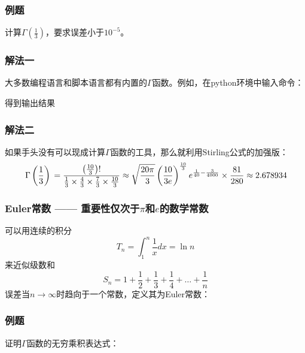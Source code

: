 \documentclass[CJK,13pt]{beamer}
\begin{document}
\begin{frame}
  \frametitle{例题}
  
  计算$\Gamma\left(\frac{1}{3}\right)$，要求误差小于$10^{-5}$。
  
\end{frame}


\begin{frame}
  \frametitle{ 解法一}
  
  大多数编程语言和脚本语言都有内置的$\Gamma$函数。例如，在python环境中输入命令：

  \skipline

  
  
  得到输出结果

  \skipline
  
  \tbox
  {
  }
  
\end{frame}


\begin{frame}
  \frametitle{ 解法二}
  
  如果手头没有可以现成计算$\Gamma$函数的工具，那么就利用Stirling公式的加强版：
    {\small
    $$
      \,\Gamma\left( \frac{1}{3} \right)\, = \frac{ \left(\frac{10}{3}\right)!}{\frac{1}{3}\times \frac{4}{3} \times \frac{7}{3}\times\frac{10}{3}}  \approx \sqrt{\frac{20\pi}{3}}\left(\frac{10}{3e}\right)^{\frac{10}{3}} e^{\frac{1}{40} - \frac{3}{4000}}\times \frac{81}{280}\approx 2.678934   $$
      }
  
\end{frame}


\begin{frame}
  \frametitle{Euler常数 —— 重要性仅次于$\pi$和$e$的数学常数}
  
  可以用连续的积分$$ T_n = \int_1^{n} \frac{1}{x} dx = \ln n $$
  来近似级数和
  $$S_n = 1+\frac{1}{2}+\frac{1}{3} + \frac{1}{4} + \ldots + \frac{1}{n}$$
  误差当$n\rightarrow \infty$时趋向于一个常数，定义其为Euler常数：
  
\end{frame}


\begin{frame}
  \frametitle{例题}
  
  证明$\Gamma$函数的无穷乘积表达式：
  
\end{frame}
\end{document}
